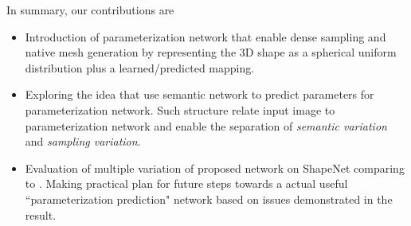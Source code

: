 In summary, our contributions are
\begin{itemize}
	\item  Introduction of parameterization network that enable dense sampling and native mesh generation by representing the 3D shape as a spherical uniform distribution plus a learned/predicted mapping.
	\item  Exploring the idea that use semantic network to predict parameters for parameterization network. Such structure  relate input image to parameterization network and enable the separation of \textit{semantic variation} and \textit{sampling variation}.
	\item Evaluation of multiple variation of proposed network on ShapeNet\citep{shapenetdata} comparing to \citep{PSGN}. Making practical plan for future steps towards a actual useful ``parameterization prediction" network based on issues demonstrated in the result.
\end{itemize}          

